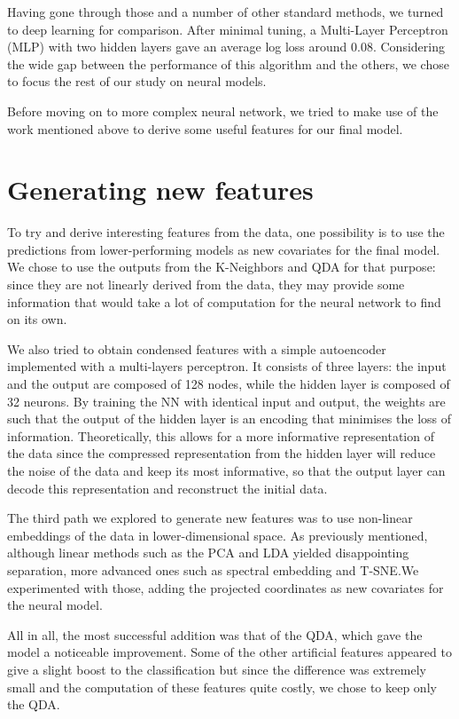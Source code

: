 \documentclass[a4paper,11pt,openany,extrafontsizes,oneside,article]{memoir}
\begin{document}
Having gone through those and a number of other standard methods, we
turned to deep learning for comparison. After minimal tuning, a
Multi-Layer Perceptron (MLP) with two hidden layers gave an average
log loss around 0.08. Considering the wide gap between the performance
of this algorithm and the others, we chose to focus the rest of our
study on neural models.

Before moving on to more complex neural network, we tried to make use
of the work mentioned above to derive some useful features for our
final model.
    
\section{Generating new features}

To try and derive interesting features from the data, one possibility
is to use the predictions from lower-performing models as new
covariates for the final model. We chose to use the outputs from the
K-Neighbors and QDA for that purpose: since they are not linearly
derived from the data, they may provide some information that would
take a lot of computation for the neural network to find on its own.
    
We also tried to obtain condensed features with a simple autoencoder
implemented with a multi-layers perceptron. It consists of three
layers: the input and the output are composed of 128 nodes, while the
hidden layer is composed of 32 neurons. By training the NN with
identical input and output, the weights are such that the output of
the hidden layer is an encoding that minimises the loss of
information. Theoretically, this allows for a more informative
representation of the data since the compressed representation from
the hidden layer will reduce the noise of the data and keep its most
informative, so that the output layer can decode this representation
and reconstruct the initial data.

The third path we explored to generate new features was to use
non-linear embeddings of the data in lower-dimensional space. As
previously mentioned, although linear methods such as the PCA and LDA
yielded disappointing separation, more advanced ones such as spectral
embedding and T-SNE.\@ We experimented with those, adding the
projected coordinates as new covariates for the neural model.

All in all, the most successful addition was that of the QDA, which
gave the model a noticeable improvement. Some of the other artificial
features appeared to give a slight boost to the classification but
since the difference was extremely small and the computation of these
features quite costly, we chose to keep only the QDA.\@
\end{document}
